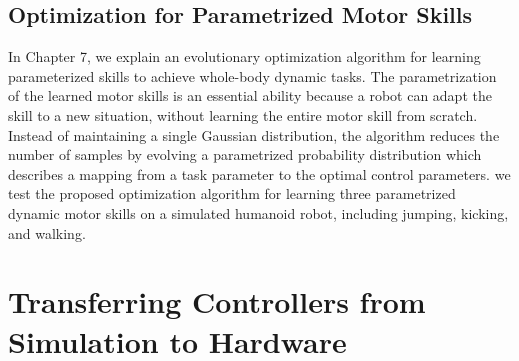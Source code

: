 \subsection{Optimization for Parametrized Motor Skills}
In Chapter 7, we explain an evolutionary optimization algorithm for
learning parameterized skills to achieve whole-body dynamic tasks.
The parametrization of the learned motor skills is an essential ability
because a robot can adapt the skill to a new situation, without
learning the entire motor skill from scratch.
Instead of maintaining a single Gaussian distribution, 
the algorithm reduces the number of samples by evolving a parametrized
probability distribution which describes a mapping from a task parameter
to the optimal control parameters.
we test the proposed optimization algorithm for learning three parametrized
dynamic motor skills on a simulated humanoid robot, including jumping,
kicking, and walking. 

\section{Transferring Controllers from Simulation to Hardware}

